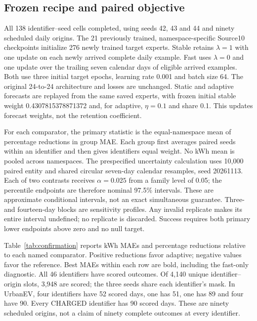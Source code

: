 \documentclass[pdflatex,iicol,sn-mathphys-num]{sn-jnl}
\begin{document}
\subsection{Frozen recipe and paired objective}
All 138 identifier--seed cells completed, using seeds 42, 43 and 44 and ninety scheduled daily origins. The 21 previously trained, namespace-specific Source10 checkpoints initialize 276 newly trained target experts. Stable retains $\lambda=1$ with one update on each newly arrived complete daily example. Fast uses $\lambda=0$ and one update over the trailing seven calendar days of eligible arrived examples. Both use three initial target epochs, learning rate 0.001 and batch size 64. The original 24-to-24 architecture and losses are unchanged. Static and adaptive forecasts are replayed from the same saved experts, with frozen initial stable weight 0.4307815378871372 and, for adaptive, $\eta=0.1$ and share 0.1. This updates forecast weights, not the retention coefficient.

For each comparator, the primary statistic is the equal-namespace mean of percentage reductions in group MAE. Each group first averages paired seeds within an identifier and then gives identifiers equal weight. No kWh mean is pooled across namespaces. The prespecified uncertainty calculation uses 10,000 paired entity and shared circular seven-day calendar resamples, seed 20261113. Each of two contrasts receives $\alpha=0.025$ from a family level of 0.05; the percentile endpoints are therefore nominal 97.5\% intervals. These are approximate conditional intervals, not an exact simultaneous guarantee. Three- and fourteen-day blocks are sensitivity profiles. Any invalid replicate makes its entire interval undefined; no replicate is discarded. Success requires both primary lower endpoints above zero and no null target.

\begin{table}[t]
\centering\small
\caption{Locked new-identifier MAE and adaptive reductions.}\label{tab:confirmation}

\end{table}
Table~\ref{tab:confirmation} reports kWh MAEs and percentage reductions relative to each named comparator. Positive reductions favor adaptive; negative values favor the reference. Best MAEs within each row are bold, including the fast-only diagnostic. All 46 identifiers have scored outcomes. Of 4,140 unique identifier--origin slots, 3,948 are scored; the three seeds share each identifier's mask. In UrbanEV, four identifiers have 52 scored days, one has 51, one has 89 and four have 90. Every CHARGED identifier has 90 scored days. These are ninety scheduled origins, not a claim of ninety complete outcomes at every identifier.
\end{document}

